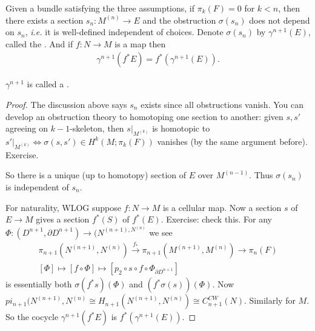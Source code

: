 \documentclass[12pt,class=article,crop=false]{standalone}
\begin{document}
\begin{thm}
Given a bundle satisfying the three assumptions, if $ \pi_k(F) = 0 $ for $ k<n$, then there exists a section  $ s_n:M^{(n)} \to E$ and the obstruction $ \sigma(s_n)$ does not depend on $ s_n$, \emph{i.e.} it is well-defined independent of choices. Denote $ \sigma(s_n)$ by $ \gamma^{n+1}(E)$, called the . And if $ f:N \to M$ is a map then
\begin{align*}
	\gamma^{n+1}(f^* E) = f^* ( \gamma^{n+1}(E)).
\end{align*}
\end{thm}
\begin{defn}
	$ \gamma^{n+1}$ is called a .
\end{defn}
\begin{proof}
The discussion above says $ s_n$ exists since all obstructions vanish. You can develop an obstruction theory to homotoping one section to another: given $ s,s'$ agreeing on  $ k-1$-skeleton, then  $ s|_{M^{(k)}}$ is homotopic to $ s'|_{M^{(k)}} \iff \sigma(s,s') \in H^{k}(M;\pi_k(F))$ vanishes (by the same argument before). Exercise.

So there is a unique (up to homotopy) section of $ E$ over  $ M^{(n-1)}$. Thus $ \sigma(s_n)$ is independent of $ s_n$.

For naturality, WLOG suppose $ f:N \to M$ is a cellular map. Now a section $ s$ of  $ E \to M$ gives a section $ f^* (S)$ of $ f^* (E)$. Exercise: check this. For any $ \Phi:(D^{n+1}, \partial D^{n+1}) \to (N^{(n+1),N^{(n)}}$ we see
\begin{align*}
	\pi_{n+1}(N^{(n+1)},N^{(n)}) \xrightarrow{ f_*} \pi_{n+1} (M^{(n+1)}, M^{(n)})  \to \pi_n(F)\\
	[\Phi] \mapsto [f \circ \Phi] \mapsto [p_2 \circ s \circ f \circ \Phi_{ \partial D^{n+1}}]
\end{align*}
is essentially both $ \sigma(f^* s)(\Phi)$ and $ (f^* \sigma(s))(\Phi)$. Now $ pi_{n+1}(N^{(n+1)},N^{(n)} \cong H_{n+1} (N^{(n+1)},N^{(n)}) \cong C_{n+1}^{CW}(N)$. Similarly for $ M$. So the cocycle  $ \gamma^{n+1}(f^* E)$ is $ f^* ( \gamma^{n+1}(E))$.
\end{proof}
\end{document}
